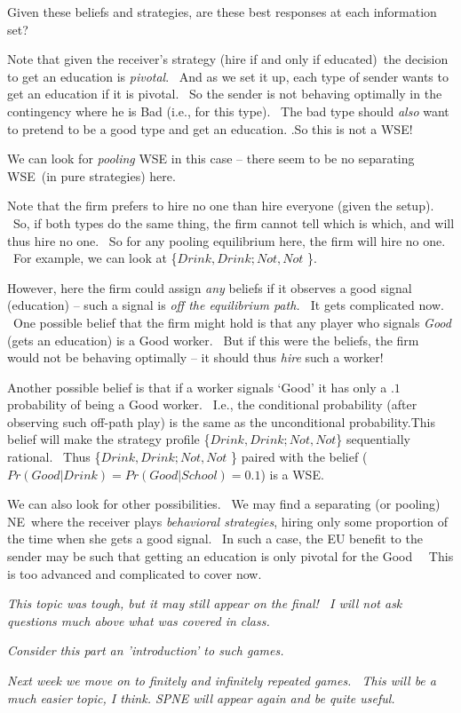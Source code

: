 \documentclass{article}
\begin{document}
Given these beliefs and strategies, are these best responses at each
information set?\bigskip

Note that given the receiver's strategy (hire if and only if educated)\ the
decision to get an education is \textit{pivotal}. \ And as we set it up,
each type of sender wants to get an education if it is pivotal. \ So the
sender is not behaving optimally in the contingency where he is Bad (i.e.,
for this type). \ The bad type should \textit{also} want to pretend to be a
good type and get an education. .So this is not a WSE!

\bigskip

We can look for \textit{pooling} WSE in this case -- there seem to be no
separating WSE\ (in pure strategies) here.

Note that the firm prefers to hire no one than hire everyone (given the
setup). \ So, if both types do the same thing, the firm cannot tell which is
which, and will thus hire no one. \ So for any pooling equilibrium here, the
firm will hire no one. \ For example, we can look at \{$Drink,Drink;Not,Not$%
\}.

However, here the firm could assign \textit{any} beliefs if it observes a
good signal (education) -- such a signal is \textit{off the equilibrium
path. \ }It gets complicated now. \ One possible belief that the firm might
hold is that any player who signals \textit{Good} (gets an education) is a
Good worker. \ But if this were the beliefs, the firm would not be behaving
optimally -- it should thus \textit{hire} such a worker!

\bigskip

Another possible belief is that if a worker signals `Good' it has only a $.1$
probability of being a Good worker. \ I.e., the conditional probability
(after observing such off-path play) is the same as the unconditional
probability.This belief will make the strategy profile \{$%
Drink,Drink;Not,Not $\} sequentially rational. \ Thus \{$Drink,Drink;Not,Not$%
\} paired with the belief ($Pr(Good|Drink)=Pr(Good|School)=0.1$) is a WSE.

\bigskip

We can also look for other possibilities. \ We may find a separating (or
pooling) NE\ where the receiver plays \textit{behavioral strategies}, hiring
only some proportion of the time when she gets a good signal. \ In such a
case, the EU benefit to the sender may be such that getting an education is
only pivotal for the Good \ \ This is too advanced and complicated to cover
now.

\bigskip

\textit{This topic was tough, but it may still appear on the final! \ I will
not ask questions much above what was covered in class.}

\textit{Consider this part an 'introduction' to such games. \ }

\textit{\bigskip }

\textit{Next week we move on to finitely and infinitely repeated games. \
This will be a much easier topic, I think. SPNE will appear again and be
quite useful.}
\end{document}
